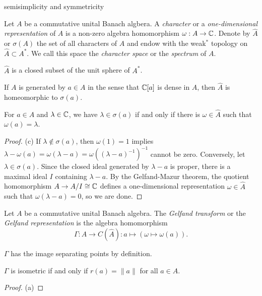 \documentclass{../../large}
\begin{document}
semisimplicity and symmetricity

\begin{prb}
Let $A$ be a commutative unital Banach algbera.
A \emph{character} or a \emph{one-dimensional representation} of $A$ is a non-zero algebra homomorphism $\omega:A\to\mathbb{C}$.
Denote by $\hat A$ or $\sigma(A)$ the set of all characters of $A$ and endow with the weak$^*$ topology on $\hat A\subset A^*$.
We call this space the \emph{character space} or the \emph{spectrum} of $A$.
\begin{parts}
\item $\hat A$ is a closed subset of the unit sphere of $A^*$.
\item If $A$ is generated by $a\in A$ in the sense that $\mathbb{C}[a]$ is dense in $A$, then $\hat A$ is homeomorphic to $\sigma(a)$.
\item For $a\in A$ and $\lambda\in\mathbb{C}$, we have $\lambda\in\sigma(a)$ if and only if there is $\omega\in\hat A$ such that $\omega(a)=\lambda$.
\end{parts}
\end{prb}
\begin{proof}

(c)
If $\lambda\notin\sigma(a)$, then $\omega(1)=1$ implies $\lambda-\omega(a)=\omega(\lambda-a)=\omega((\lambda-a)^{-1})^{-1}$ cannot be zero.
Conversely, let $\lambda\in\sigma(a)$.
Since the closed ideal generated by $\lambda-a$ is proper, there is a maximal ideal $I$ containing $\lambda-a$.
By the Gelfand-Mazur theorem, the quotient homomorphism $A\to A/I\cong\mathbb{C}$ defines a one-dimensional representation $\omega\in\hat A$ such that $\omega(\lambda-a)=0$, so we are done.
\end{proof}


\begin{prb}
Let $A$ be a commutative unital Banach algebra.
The \emph{Gelfand transform} or the \emph{Gelfand representation} is the algebra homomorphism
\[\Gamma:A\to C(\hat A):a\mapsto(\omega\mapsto\omega(a)).\]
\begin{parts}
\item $\Gamma$ has the image separating points by definition.
\item $\Gamma$ is isometric if and only if $r(a)=\|a\|$ for all $a\in A$.
\end{parts}
\end{prb}
\begin{proof}
(a)

\end{proof}
\end{document}
